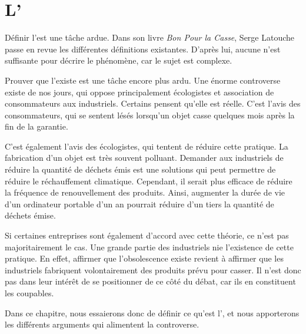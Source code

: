 \chapter{L'\OP}

Définir l'\op est une tâche ardue. Dans son livre \textit{Bon Pour la Casse}, Serge Latouche passe en revue les différentes définitions existantes. D'après lui, aucune n'est suffisante pour décrire le phénomène, car le sujet est complexe.

Prouver que l'\op existe est une tâche encore plus ardu. Une énorme controverse existe de nos jours, qui oppose principalement écologistes et association de consommateurs aux industriels. 
\smallbreak
Certains pensent qu'elle est réelle. C'est l'avis des consommateurs, qui se sentent lésés lorsqu'un objet casse quelques mois après la fin de la garantie.

C'est également  l'avis des écologistes, qui tentent  de réduire cette pratique. La fabrication d'un objet est très souvent polluant. Demander aux industriels de réduire la quantité de déchets émis est une solutions qui peut permettre de réduire le réchauffement climatique. Cependant,  il serait plus efficace de réduire la fréquence de renouvellement des produits. Ainsi, augmenter  la durée de vie d'un ordinateur portable d'un an pourrait réduire d'un tiers la quantité de déchets émise.  

Si certaines entreprises sont également d'accord avec cette théorie, ce n'est pas majoritairement le cas. Une grande partie des industriels nie l'existence de cette pratique. En effet, affirmer que l'obsolescence existe revient à affirmer que les industriels fabriquent volontairement des produits prévu pour casser. Il n'est donc pas dans leur intérêt	de se positionner de ce côté du débat, car ils en constituent les coupables. 

\smallbreak

Dans ce chapitre, nous essaierons donc de définir ce qu'est l'\op, et nous apporterons les différents arguments qui alimentent la controverse. 
